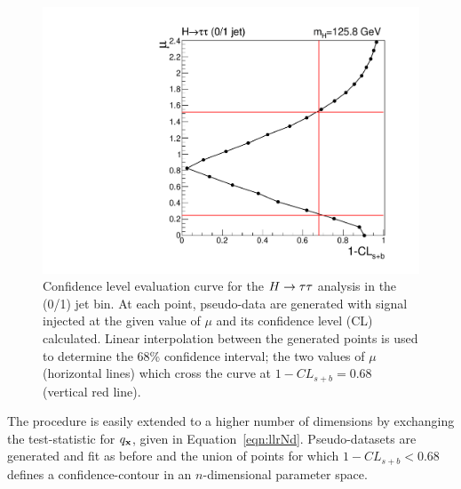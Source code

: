 \begin{figure}
\begin{center}
\includegraphics[width=.7\textwidth]{combinations/confcurve_htt.pdf}
\end{center}
\caption{Confidence level evaluation curve for the $H\rightarrow\tau\tau$ analysis in the (0/1) jet bin. 
At each point, pseudo-data are generated with signal injected at the given value of $\mu$
and its confidence level (CL) calculated.
Linear interpolation between the generated points is used to determine the 68\% confidence 
interval; the two values of $\mu$ (horizontal lines) which cross the curve at $1-CL_{s+b}=0.68$
(vertical red line).}
\label{fig:confcontour}
\end{figure}
The procedure is easily extended to a higher number of dimensions
by exchanging the test-statistic for $q_{{\mathbf{x}}}$, given in Equation~\ref{eqn:llrNd}.
Pseudo-datasets are generated and fit as before and the union of points for which
$1-CL_{s+b}<0.68$ defines a confidence-contour in an $n$-dimensional parameter space.


